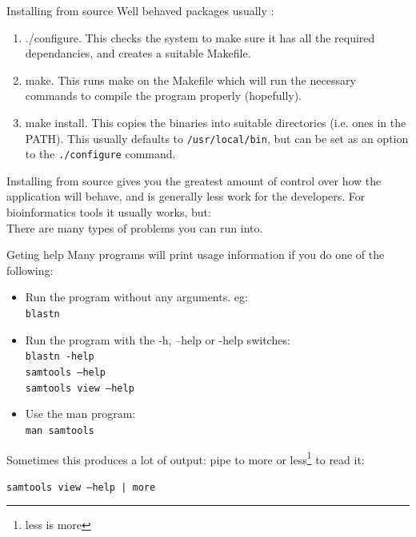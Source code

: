 \documentclass[pdf]{beamer}
\begin{document}
\begin{frame}{Installing from source}
  Well behaved packages usually :
  \begin{enumerate}
  \item ./configure. This checks the system to make sure it has all the
    required dependancies, and creates a suitable Makefile.
  \item make. This runs make on the Makefile which will run the necessary
    commands to compile the program properly (hopefully).
  \item make install. This copies the binaries into suitable directories
    (i.e. ones in the PATH). This usually defaults to \texttt{/usr/local/bin},
    but can be set as an option to the \texttt{./configure} command.
  \end{enumerate}
  
  Installing from source gives you the greatest amount of control over how the
  application will behave, and is generally less work for the developers. For
  bioinformatics tools it usually works, but:\\
  There are many types of problems you can run into.
\end{frame}

\begin{frame}{Geting help}
  Many programs will print usage information if you do one of the following:
  \begin{itemize}
  \item Run the program without any arguments. eg:\\
    \texttt{blastn}
  \item Run the program with the -h, --help or -help switches:\\
    \texttt{blastn -help}\\
    \texttt{samtools --help}\\
    \texttt{samtools view --help}
  \item Use the man program:\\
    \texttt{man samtools}
  \end{itemize}
  
  Sometimes this produces a lot of output: pipe to more or less\footnote{less
    is more} to read it:

  \texttt{samtools view --help | more}
\end{frame}
\end{document}
